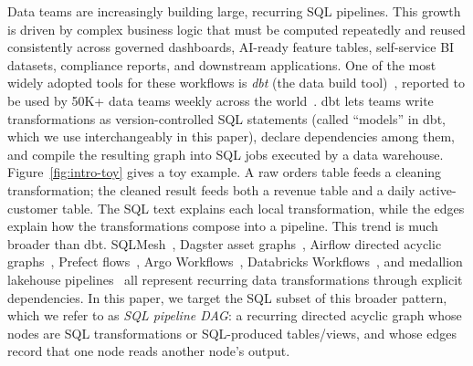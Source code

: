 Data teams are increasingly building large, recurring SQL pipelines. This growth is driven by complex business logic that must be computed repeatedly and reused consistently across governed dashboards, AI-ready feature tables, self-service BI datasets, compliance reports, and downstream applications.
 One of the most widely adopted tools for these workflows is \emph{dbt} (the data build tool)~\cite{dbtWhatExactly}, reported to be used by 50K+ data teams weekly across the world~\cite{dbtComplexity}. 
dbt lets teams write transformations as version-controlled SQL  statements (called ``models'' in dbt, which we use interchangeably in this paper), declare dependencies among them, and compile the resulting graph into SQL jobs executed by a data warehouse.  Figure~\ref{fig:intro-toy} gives a toy example. A raw orders table feeds a cleaning transformation; the cleaned result feeds both a revenue table and a daily active-customer table. The SQL text explains each local transformation, while the edges explain how the transformations compose into a pipeline.
This trend is much broader than dbt. SQLMesh~\cite{sqlmeshOverview}, Dagster asset graphs~\cite{dagsterAssets}, Airflow directed acyclic graphs~\cite{airflowDags}, Prefect flows~\cite{prefectTasks}, Argo Workflows~\cite{argoDag}, Databricks Workflows~\cite{databricksJobs}, and medallion lakehouse pipelines~\cite{databricksMedallion} all represent recurring data transformations through explicit dependencies. In this paper, we target the SQL subset of this broader pattern, which we refer to as \emph{SQL pipeline DAG}: a recurring directed acyclic graph whose nodes are SQL transformations or SQL-produced tables/views, and whose edges record that one node reads another node's output.

